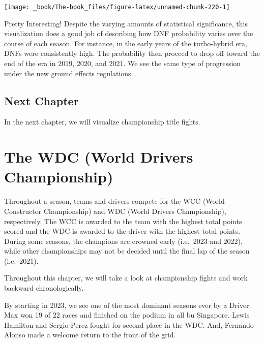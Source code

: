 \documentclass[
]{book}
\begin{document}
\begin{center}\texttt{[image: \_book/The-book\_files/figure-latex/unnamed-chunk-220-1]} \end{center}

Pretty Interesting! Despite the varying amounts of statistical significance, this visualization does a good job of describing how DNF probability varies over the course of each season. For instance, in the early years of the turbo-hybrid era, DNFs were consistently high. The probability then proceed to drop off toward the end of the era in 2019, 2020, and 2021. We see the same type of progression under the new ground effects regulations.

\hypertarget{next-chapter-5}{%
\section{Next Chapter}\label{next-chapter-5}}

In the next chapter, we will visualize championship title fights.

\hypertarget{the-wdc-world-drivers-championship}{%
\chapter{The WDC (World Drivers Championship)}\label{the-wdc-world-drivers-championship}}

Throughout a season, teams and drivers compete for the WCC (World Constructor Championship) and WDC (World Drivers Championship), respectively. The WCC is awarded to the team with the highest total points scored and the WDC is awarded to the driver with the highest total points. During some seasons, the champions are crowned early (i.e.~2023 and 2022), while other championships may not be decided until the final lap of the season (i.e.~2021).

Throughout this chapter, we will take a look at championship fights and work backward chronologically.

By starting in 2023, we see one of the most dominant seasons ever by a Driver. Max won 19 of 22 races and finished on the podium in all bu Singapore. Lewis Hamilton and Sergio Perez fought for second place in the WDC. And, Fernando Alonso made a welcome return to the front of the grid.
\end{document}
